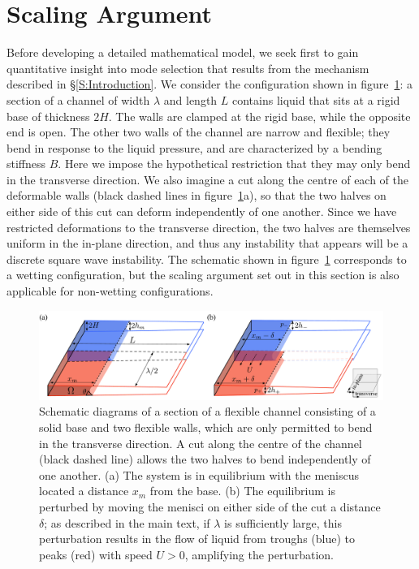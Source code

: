 \documentclass{jfm}
\begin{document}
\section{Scaling Argument}\label{S:Scaling}
Before developing a detailed mathematical model, we seek first to gain quantitative insight into mode selection that results from the mechanism described in \S\ref{S:Introduction}. We consider the configuration shown in figure~\ref{fig:Scaling:ScalingArgument}: a section of a channel of width $\lambda$ and length $L$ contains liquid that sits at a rigid base of thickness $2H$. The walls are clamped at the rigid base, while the opposite end is open. The other two walls of the channel are narrow and flexible; they bend in response to the liquid pressure, and are characterized by a bending stiffness $B$. Here we impose the hypothetical restriction that they may only bend in the transverse direction. We also imagine a cut along the centre of each of the deformable walls (black dashed lines in figure~\ref{fig:Scaling:ScalingArgument}a), so that the two halves on either side of this cut can deform independently of one another. Since we have restricted deformations to the transverse direction, the two halves are themselves uniform in the in-plane direction, and thus any instability that appears will be a discrete square wave instability. The schematic shown in figure~\ref{fig:Scaling:ScalingArgument} corresponds to a wetting configuration, but the scaling argument set out in this section is also applicable for non-wetting configurations.

\begin{figure}
\centering
\includegraphics[width = .99\textwidth]{figures/ScalingArgument.pdf}
\caption{Schematic diagrams of a section of a flexible channel consisting of a solid base and two flexible walls, which are only permitted to bend in the transverse direction. A cut along the centre of the channel (black dashed line) allows the two halves to bend independently of one another. (a) The system is in equilibrium with the meniscus located a distance $x_m$ from the base.  (b) The equilibrium is perturbed by moving the menisci on either side of the cut a distance $\delta$; as described in the main text, if $\lambda$ is sufficiently large, this perturbation results in the flow of liquid from troughs (blue) to peaks (red) with speed $U > 0$, amplifying the perturbation.}
\label{fig:Scaling:ScalingArgument}
\end{figure}
\end{document}
